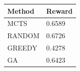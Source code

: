 \begin{tabular}{ll}
\hline
Method & Reward \\
\hline
  MCTS & 0.6589 \\
  RANDOM & 0.6726 \\
  GREEDY & 0.4278 \\
  GA & 0.6423 \\
\hline
\end{tabular}
